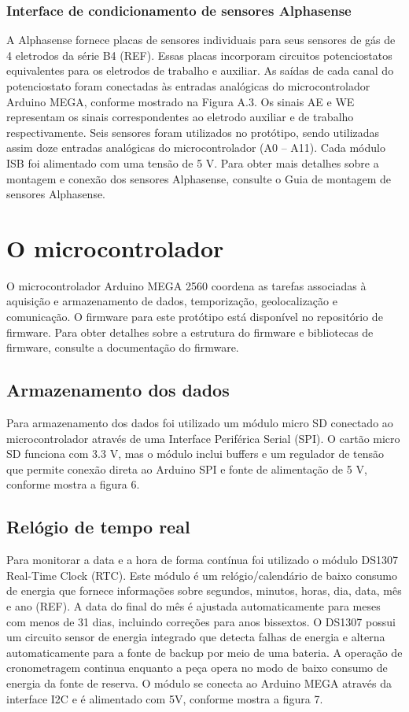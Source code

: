\subsubsection{Interface de condicionamento de sensores Alphasense}

A Alphasense fornece placas de sensores individuais para seus sensores de gás de 4 eletrodos da série B4 (REF). Essas placas incorporam circuitos potenciostatos equivalentes para os eletrodos de trabalho e auxiliar. As saídas de cada canal do potenciostato foram conectadas às entradas analógicas do microcontrolador Arduino MEGA, conforme mostrado na Figura A.3. Os sinais AE e WE representam os sinais correspondentes ao eletrodo auxiliar e de trabalho respectivamente. Seis sensores foram utilizados no protótipo, sendo utilizadas assim doze entradas analógicas do microcontrolador (A0 – A11). Cada módulo ISB foi alimentado com uma tensão de 5 V. Para obter mais detalhes sobre a montagem e conexão dos sensores Alphasense, consulte o Guia de montagem de sensores Alphasense.

\section{O microcontrolador}

O microcontrolador Arduino MEGA 2560 coordena as tarefas associadas à aquisição e armazenamento de dados, temporização, geolocalização e comunicação. O firmware para este protótipo está disponível no repositório de firmware. Para obter detalhes sobre a estrutura do firmware e bibliotecas de firmware, consulte a documentação do firmware.

\subsection{Armazenamento dos dados}

Para armazenamento dos dados foi utilizado um módulo micro SD conectado ao microcontrolador através de uma Interface Periférica Serial (SPI). O cartão micro SD funciona com 3.3 V, mas o módulo inclui buffers e um regulador de tensão que permite conexão direta ao Arduino SPI e fonte de alimentação de 5 V, conforme mostra a figura 6.

\subsection{Relógio de tempo real}

Para monitorar a data e a hora de forma contínua foi utilizado o módulo DS1307 Real-Time Clock (RTC). Este módulo é um relógio/calendário de baixo consumo de energia que fornece informações sobre segundos, minutos, horas, dia, data, mês e ano (REF). A data do final do mês é ajustada automaticamente para meses com menos de 31 dias, incluindo correções para anos bissextos. O DS1307 possui um circuito sensor de energia integrado que detecta falhas de energia e alterna automaticamente para a fonte de backup por meio de uma bateria. A operação de cronometragem continua enquanto a peça opera no modo de baixo consumo de energia da fonte de reserva. O módulo se conecta ao Arduino MEGA através da interface I2C e é alimentado com 5V, conforme mostra a figura 7.


